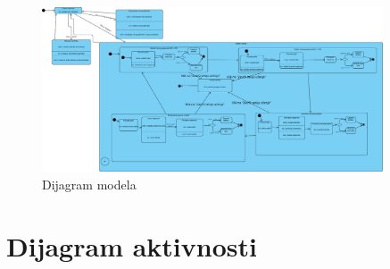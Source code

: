 			
        \begin{figure}[H]
            \includegraphics[width=0.9\textwidth]{dijagrami/Dijagram_stanja.png} 
            \centering
            \caption{Dijagram modela}
            \label{fig:class_diagram}
        \end{figure}			
			
			\eject 
		
		\section{Dijagram aktivnosti}
			
